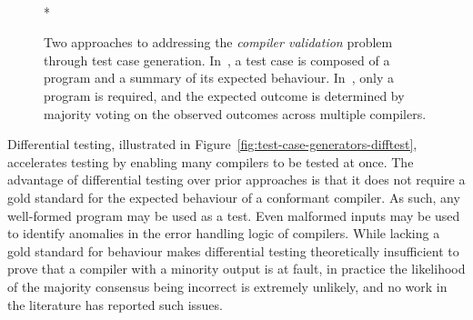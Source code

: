 \begin{figure}
  \centering
  \\*
  \caption[Generating and evaluating compiler test cases]{%
    Two approaches to addressing the \emph{compiler validation} problem through test case generation. In~\protect{}, a test case is composed of a program and a summary of its expected behaviour. In~\protect{}, only a program is required, and the expected outcome is determined by majority voting on the observed outcomes across multiple compilers.%
  }%
  \label{fig:test-case-generators}
\end{figure}

Differential testing, illustrated in Figure~\ref{fig:test-case-generators-difftest}, accelerates testing by enabling many compilers to be tested at once. The advantage of differential testing over prior approaches is that it does not require a gold standard for the expected behaviour of a conformant compiler. As such, any well-formed program may be used as a test. Even malformed inputs may be used to identify anomalies in the error handling logic of compilers. While lacking a gold standard for behaviour makes differential testing theoretically insufficient to prove that a compiler with a minority output is at fault, in practice the likelihood of the majority consensus being incorrect is extremely unlikely, and no work in the literature has reported such issues.

